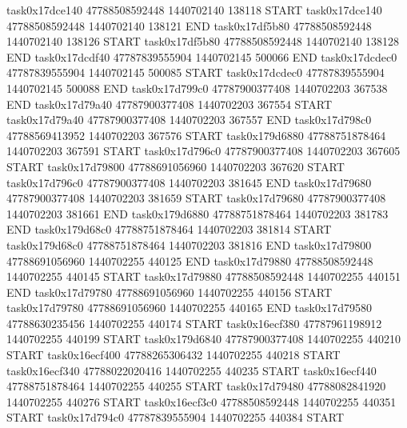 task0x17dce140 47788508592448          1440702140               138118  START
task0x17dce140 47788508592448          1440702140               138121  END
task0x17df5b80 47788508592448          1440702140               138126  START
task0x17df5b80 47788508592448          1440702140               138128  END
task0x17dcdf40 47787839555904          1440702145               500066  END
task0x17dcdec0 47787839555904          1440702145               500085  START
task0x17dcdec0 47787839555904          1440702145               500088  END
task0x17d799c0 47787900377408          1440702203               367538  END
task0x17d79a40 47787900377408          1440702203               367554  START
task0x17d79a40 47787900377408          1440702203               367557  END
task0x17d798c0 47788569413952          1440702203               367576  START
task0x179d6880 47788751878464          1440702203               367591  START
task0x17d796c0 47787900377408          1440702203               367605  START
task0x17d79800 47788691056960          1440702203               367620  START
task0x17d796c0 47787900377408          1440702203               381645  END
task0x17d79680 47787900377408          1440702203               381659  START
task0x17d79680 47787900377408          1440702203               381661  END
task0x179d6880 47788751878464          1440702203               381783  END
task0x179d68c0 47788751878464          1440702203               381814  START
task0x179d68c0 47788751878464          1440702203               381816  END
task0x17d79800 47788691056960          1440702255               440125  END
task0x17d79880 47788508592448          1440702255               440145  START
task0x17d79880 47788508592448          1440702255               440151  END
task0x17d79780 47788691056960          1440702255               440156  START
task0x17d79780 47788691056960          1440702255               440165  END
task0x17d79580 47788630235456          1440702255               440174  START
task0x16ecf380 47787961198912          1440702255               440199  START
task0x179d6840 47787900377408          1440702255               440210  START
task0x16ecf400 47788265306432          1440702255               440218  START
task0x16ecf340 47788022020416          1440702255               440235  START
task0x16ecf440 47788751878464          1440702255               440255  START
task0x17d79480 47788082841920          1440702255               440276  START
task0x16ecf3c0 47788508592448          1440702255               440351  START
task0x17d794c0 47787839555904          1440702255               440384  START
